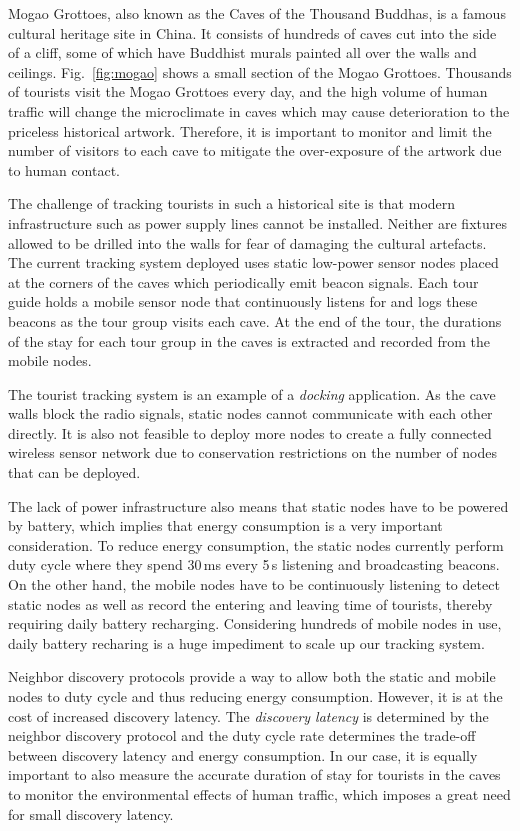 \documentclass[twoside,twocolumn]{article}
\begin{document}
Mogao Grottoes, also known as the Caves of the Thousand Buddhas, is a
famous cultural heritage site in China. It consists of hundreds of
caves cut into the side of a cliff, some of which have Buddhist murals
painted all over the walls and ceilings.  Fig.~\ref{fig:mogao} shows
a small section of the Mogao Grottoes. Thousands of tourists visit the
Mogao Grottoes every day, and the high volume of human traffic will
change the microclimate in caves which may cause deterioration to the 
priceless historical artwork. Therefore, it is important to monitor and 
limit the number of visitors to each cave to mitigate the over-exposure 
of the artwork due to human contact.

The challenge of tracking tourists in such a historical site is that
modern infrastructure such as power supply lines cannot be installed. 
Neither are fixtures allowed to be drilled into the walls
for fear of damaging the cultural artefacts. The current tracking
system deployed uses static low-power sensor nodes placed at the
corners of the caves which periodically emit beacon signals.  Each
tour guide holds a mobile sensor node that continuously listens for
and logs these beacons as the tour group visits each cave.  At the end
of the tour, the durations of the stay for each tour group in the
caves is extracted and recorded from the mobile nodes.

The tourist tracking system is an example of a {\em docking}
application. As the cave walls block the radio signals, static nodes
cannot communicate with each other directly. It is also not feasible
to deploy more nodes to create a fully connected wireless sensor
network due to conservation restrictions on the number of nodes that
can be deployed.

The lack of power infrastructure also means that static nodes have to
be powered by battery, which implies that energy consumption is a very
important consideration. To reduce energy consumption, the static
nodes currently perform duty cycle where they spend 30\,ms every 5\,s
listening and broadcasting beacons.  On the other hand, the mobile
nodes have to be continuously listening to detect static nodes as well
as record the entering and leaving time of tourists, thereby requiring
daily battery recharging. Considering hundreds of mobile nodes in use,
daily battery recharing is a huge impediment to scale up our tracking
system.

Neighbor discovery protocols provide a way to allow both the static and 
mobile nodes to duty cycle and thus reducing energy consumption. However, 
it is at the cost of increased discovery latency. The {\em discovery latency} 
is determined by the neighbor discovery protocol and the duty cycle rate 
determines the trade-off between discovery latency and energy consumption. 
In our case, it is equally important to also measure the accurate duration 
of stay for tourists in the caves to monitor the environmental effects of 
human traffic, which imposes a great need for small discovery latency.
\end{document}
